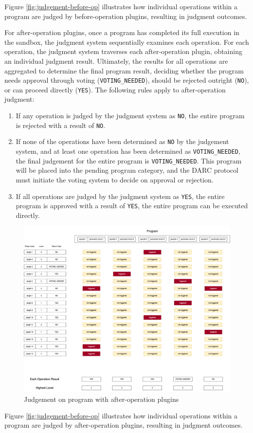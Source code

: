 \documentclass[main.tex]{subfiles}
\begin{document}
Figure \ref{fig:judgement-before-op} illustrates how individual operations within a program are judged by before-operation plugins, resulting in judgment outcomes.







For after-operation plugins, once a program has completed its full execution in the sandbox, the judgment system sequentially examines each operation. For each operation, the judgment system traverses each after-operation plugin, obtaining an individual judgment result. Ultimately, the results for all operations are aggregated to determine the final program result, deciding whether the program needs approval through voting (\texttt{VOTING\_NEEDED}), should be rejected outright (\texttt{NO}), or can proceed directly (\texttt{YES}). The following rules apply to after-operation judgment:

\begin{enumerate}
    \item If any operation is judged by the judgment system as \texttt{NO}, the entire program is rejected with a result of \texttt{NO}.
    \item If none of the operations have been determined as \texttt{NO} by the judgement system, and at least one operation has been determined as \texttt{VOTING\_NEEDED}, the final judgement for the entire program is \texttt{VOTING\_NEEDED}. This program will be placed into the pending program category, and the DARC protocol must initiate the voting system to decide on approval or rejection.
    \item If all operations are judged by the judgment system as \texttt{YES}, the entire program is approved with a result of \texttt{YES}, the entire program can be executed directly.
\end{enumerate}


\begin{figure}
    \centering
    \includegraphics[width=1\linewidth]{judgement_plugin_levels_after_ops.drawio.png}
    \caption{\label{fig:judgement-after-op}Judgement on program with after-operation plugins}
\end{figure}

Figure \ref{fig:judgement-before-op} illustrates how individual operations within a program are judged by after-operation plugins, resulting in judgment outcomes.
\end{document}
